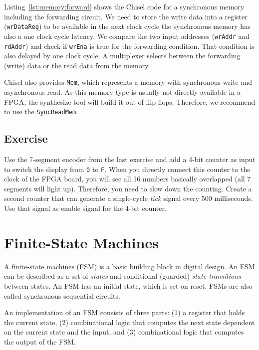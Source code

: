 \documentclass[%
    10pt,
    headinclude, footexclude,
    openright, %
    notitlepage,
    cleardoubleempty,
    headsepline,
    pointlessnumbers,
    bibtotoc, idxtotoc,
    ]{scrbook}
\newcommand{\code}[1]{{\small{\texttt{#1}}}}
\begin{document}
Listing~\ref{lst:memory:forward} shows the Chisel code for a synchronous memory
including the forwarding circuit. We need to store the write data into a register
(\code{wrDataReg}) to be available in the next clock cycle the synchronous
memory has also a one clock cycle latency.
We compare the two input addresses (\code{wrAddr} and \code{rdAddr})
and check if \code{wrEna} is true for the forwarding condition.
That condition is also delayed by one clock cycle.
A multiplexer selects between the forwarding (write) data or the read
data from the memory.




Chisel also provides \code{Mem}, which represents a memory with synchronous
write and asynchronous read. As this memory type is usually not directly available
in a FPGA, the synthesize tool will build it out of flip-flops.
Therefore, we recommend to use the \code{SyncReadMem}.


\section{Exercise}

Use the 7-segment encoder from the last exercise and add a 4-bit counter as input
to switch the display from \code{0} to \code{F}. When you directly connect this
counter to the clock of the FPGA board, you will see all 16 numbers basically
overlapped (all 7 segments will light up).
Therefore, you need to slow down the counting. Create a second
counter that can generate a single-cycle \emph{tick} signal every 500 milliseconds.
Use that signal as enable signal for the 4-bit counter.

\chapter{Finite-State Machines}

A finite-state machines (FSM) is a basic building block in digital design.
An FSM can be described as a set of \emph{states} and conditional (guarded)
\emph{state transitions} between states. 
An FSM has an initial state, which is set on reset.
FSMs are also called synchronous sequential circuits.

An implementation of an FSM consists of three parts: (1) a register that holds the current state,
(2) combinational logic that computes the next state dependent on the current
state and the input, and (3) combinational logic that computes the output of the FSM.
\end{document}
